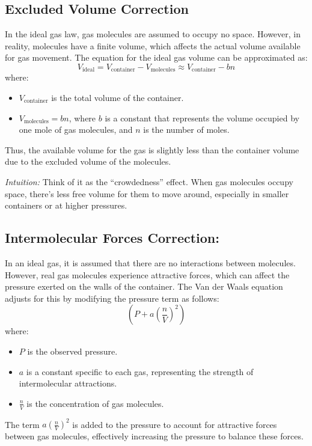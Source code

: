 \documentclass{report}
\begin{document}
\subsection{Excluded Volume Correction}
In the ideal gas law, gas molecules are assumed to occupy no space. However, in reality, molecules have a finite volume, which affects the actual volume available for gas movement. The equation for the ideal gas volume can be approximated as:
\[
	V_{\text{ideal}} = V_{\text{container}} - V_{\text{molecules}} \approx V_{\text{container}} - bn
\]
where:
\begin{itemize}
	\item \( V_{\text{container}} \) is the total volume of the container.
	\item \( V_{\text{molecules}} = bn \), where \( b \) is a constant that represents the volume occupied by one mole of gas molecules, and \( n \) is the number of moles.
\end{itemize}
Thus, the available volume for the gas is slightly less than the container volume due to the excluded volume of the molecules.

\begin{center}
	\textit{Intuition:} Think of it as the ``crowdedness'' effect. When gas molecules occupy space, there's less free volume for them to move around, especially in smaller containers or at higher pressures.
\end{center}

\subsection{Intermolecular Forces Correction:}
In an ideal gas, it is assumed that there are no interactions between molecules. However, real gas molecules experience attractive forces, which can affect the pressure exerted on the walls of the container. The Van der Waals equation adjusts for this by modifying the pressure term as follows:
\[
	\left( P + a \left( \frac{n}{V} \right)^2 \right)
\]
where:
\begin{itemize}
	\item \( P \) is the observed pressure.
	\item \( a \) is a constant specific to each gas, representing the strength of intermolecular attractions.
	\item \( \frac{n}{V} \) is the concentration of gas molecules.
\end{itemize}
The term \( a \left( \frac{n}{V} \right)^2 \) is added to the pressure to account for attractive forces between gas molecules, effectively increasing the pressure to balance these forces.
\end{document}
